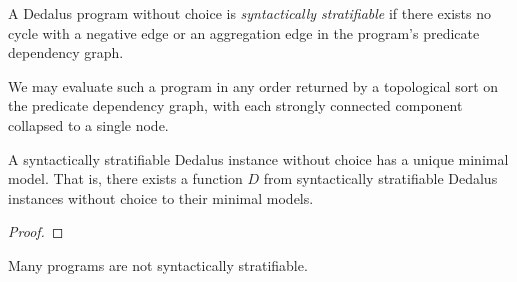 \begin{definition}
%
A Dedalus program without choice is \emph{syntactically stratifiable} if there
exists no cycle with a negative edge or an aggregation edge in the program's
predicate dependency graph.
%
\end{definition}


We may evaluate such a program in any order returned by a topological sort on
the predicate dependency graph, with each strongly connected component
collapsed to a single node.

\begin{lemma}
%
A syntactically stratifiable Dedalus instance without choice has a unique
minimal model.  That is, there exists a function $D$ from syntactically
stratifiable Dedalus instances without choice to their minimal models.
%
\end{lemma}

\begin{proof}
%

%
\end{proof}

Many programs are not syntactically stratifiable.  


